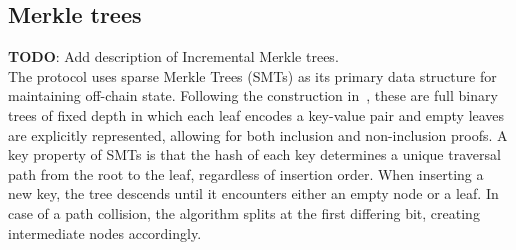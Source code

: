 



\subsection{Merkle trees}
\label{sec:cryptographic-primitives:merkle-trees}

{\color{blue}\textbf{TODO}: Add description of Incremental Merkle trees.}\\

The \davinci protocol uses sparse Merkle Trees (SMTs) as its primary data structure for maintaining off-chain state. Following the construction in~\cite{baylina2019sparse}, these are full binary trees of fixed depth in which each leaf encodes a key-value pair and empty leaves are explicitly represented, allowing for both inclusion and non-inclusion proofs. A key property of SMTs is that the hash of each key determines a unique traversal path from the root to the leaf, regardless of insertion order. When inserting a new key, the tree descends until it encounters either an empty node or a leaf. In case of a path collision, the algorithm splits at the first differing bit, creating intermediate nodes accordingly. 


